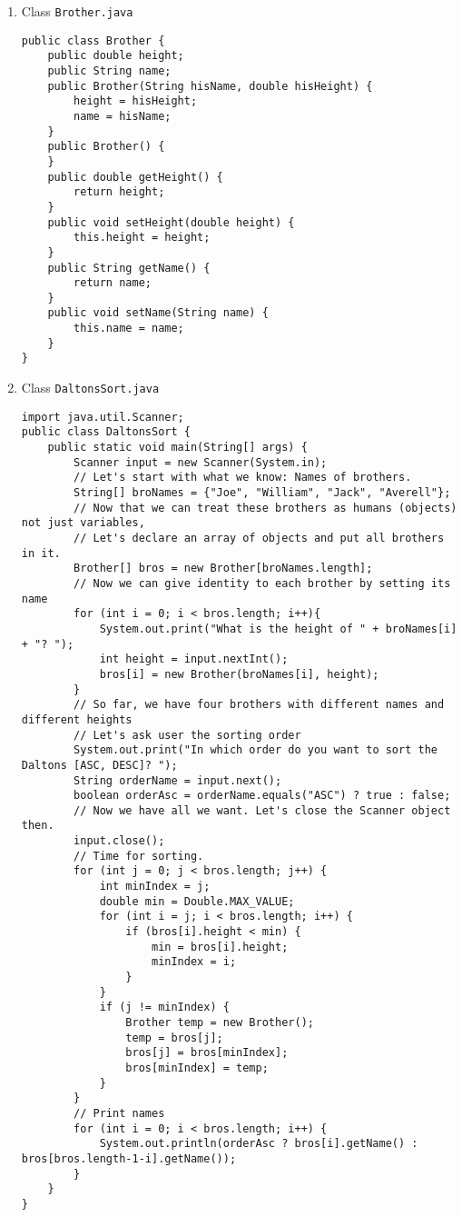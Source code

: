 \begin{enumerate}
\item Class \texttt{Brother.java}

\lstset{language=java,tabsize=2}
\begin{lstlisting}
public class Brother {
	public double height;
	public String name;
	public Brother(String hisName, double hisHeight) {
		height = hisHeight;
		name = hisName;
	}
	public Brother() {
	}
	public double getHeight() {
		return height;
	}
	public void setHeight(double height) {
		this.height = height;
	}
	public String getName() {
		return name;
	}
	public void setName(String name) {
		this.name = name;
	}
}
\end{lstlisting}

\item Class \texttt{DaltonsSort.java}
\lstset{language=java,tabsize=2}
\begin{lstlisting}
import java.util.Scanner;
public class DaltonsSort {
	public static void main(String[] args) {
		Scanner input = new Scanner(System.in);
		// Let's start with what we know: Names of brothers.
		String[] broNames = {"Joe", "William", "Jack", "Averell"};
		// Now that we can treat these brothers as humans (objects) not just variables,
		// Let's declare an array of objects and put all brothers in it.
		Brother[] bros = new Brother[broNames.length];
		// Now we can give identity to each brother by setting its name
		for (int i = 0; i < bros.length; i++){
			System.out.print("What is the height of " + broNames[i] + "? ");
			int height = input.nextInt();
			bros[i] = new Brother(broNames[i], height);
		}
		// So far, we have four brothers with different names and different heights
		// Let's ask user the sorting order
		System.out.print("In which order do you want to sort the Daltons [ASC, DESC]? ");
		String orderName = input.next();
		boolean orderAsc = orderName.equals("ASC") ? true : false;
		// Now we have all we want. Let's close the Scanner object then.
		input.close();
		// Time for sorting.
		for (int j = 0; j < bros.length; j++) {
			int minIndex = j;
			double min = Double.MAX_VALUE;
			for (int i = j; i < bros.length; i++) {
				if (bros[i].height < min) {
					min = bros[i].height;
					minIndex = i;
				}
			}
			if (j != minIndex) {
				Brother temp = new Brother();
				temp = bros[j];
				bros[j] = bros[minIndex];
				bros[minIndex] = temp;
			}
		}
		// Print names
		for (int i = 0; i < bros.length; i++) {
			System.out.println(orderAsc ? bros[i].getName() : bros[bros.length-1-i].getName());
		}
	}
}
\end{lstlisting}
\end{enumerate}

